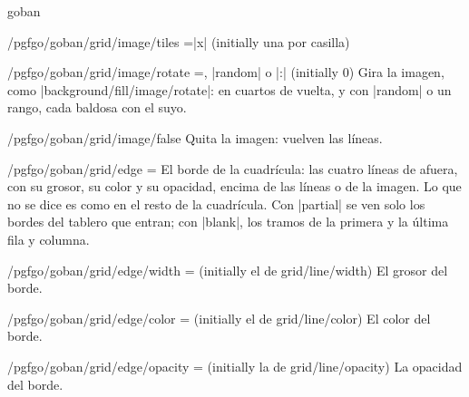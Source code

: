 \begin{environment}{{goban}}
\begin{key}{/pgfgo/goban/grid/image/tiles =|x| (initially una por casilla)}
		\begin{codeexample}[]
			\begin{goban}[9, grid = {image = {file = pgfgo-cell.png, fit = tile, tiles = 4}}, hoshi = false]
			\end{goban}
		\end{codeexample}
	\end{key}

	\begin{key}{/pgfgo/goban/grid/image/rotate =, |random| o |:| (initially 0)}
		Gira la imagen, como |background/fill/image/rotate|: en cuartos de vuelta, y con |random| o un rango, cada baldosa con el suyo.
	\end{key}

	\begin{stylekey}{/pgfgo/goban/grid/image/false}
		Quita la imagen: vuelven las líneas.
	\end{stylekey}

	\begin{key}{/pgfgo/goban/grid/edge =}
		El borde de la cuadrícula: las cuatro líneas de afuera, con su grosor, su color y su opacidad, encima de las líneas o de la imagen. Lo que no se dice es como en el resto de la cuadrícula. Con |partial| se ven solo los bordes del tablero que entran; con |blank|, los tramos de la primera y la última fila y columna.

		\begin{codeexample}[]
			\begin{goban}[5, grid = {edge = {width = 1.5pt}}]
			\end{goban}

			\begin{goban}[9, partial = A1:E5, grid = {edge = {width = 1.5pt, color = brown}}]
			\end{goban}
		\end{codeexample}
	\end{key}

	\begin{key}{/pgfgo/goban/grid/edge/width = (initially el de grid/line/width)}
		El grosor del borde.
	\end{key}

	\begin{key}{/pgfgo/goban/grid/edge/color = (initially el de grid/line/color)}
		El color del borde.
	\end{key}

	\begin{key}{/pgfgo/goban/grid/edge/opacity = (initially la de grid/line/opacity)}
		La opacidad del borde.
	\end{key}


\end{environment}
